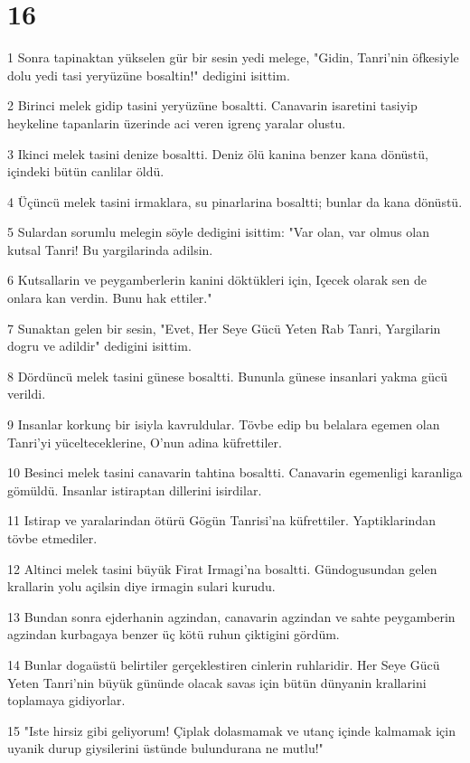 \chapter{16}

\par 1 Sonra tapinaktan yükselen gür bir sesin yedi melege, "Gidin, Tanri'nin öfkesiyle dolu yedi tasi yeryüzüne bosaltin!" dedigini isittim.
\par 2 Birinci melek gidip tasini yeryüzüne bosaltti. Canavarin isaretini tasiyip heykeline tapanlarin üzerinde aci veren igrenç yaralar olustu.
\par 3 Ikinci melek tasini denize bosaltti. Deniz ölü kanina benzer kana dönüstü, içindeki bütün canlilar öldü.
\par 4 Üçüncü melek tasini irmaklara, su pinarlarina bosaltti; bunlar da kana dönüstü.
\par 5 Sulardan sorumlu melegin söyle dedigini isittim: "Var olan, var olmus olan kutsal Tanri! Bu yargilarinda adilsin.
\par 6 Kutsallarin ve peygamberlerin kanini döktükleri için, Içecek olarak sen de onlara kan verdin. Bunu hak ettiler."
\par 7 Sunaktan gelen bir sesin, "Evet, Her Seye Gücü Yeten Rab Tanri, Yargilarin dogru ve adildir" dedigini isittim.
\par 8 Dördüncü melek tasini günese bosaltti. Bununla günese insanlari yakma gücü verildi.
\par 9 Insanlar korkunç bir isiyla kavruldular. Tövbe edip bu belalara egemen olan Tanri'yi yücelteceklerine, O'nun adina küfrettiler.
\par 10 Besinci melek tasini canavarin tahtina bosaltti. Canavarin egemenligi karanliga gömüldü. Insanlar istiraptan dillerini isirdilar.
\par 11 Istirap ve yaralarindan ötürü Gögün Tanrisi'na küfrettiler. Yaptiklarindan tövbe etmediler.
\par 12 Altinci melek tasini büyük Firat Irmagi'na bosaltti. Gündogusundan gelen krallarin yolu açilsin diye irmagin sulari kurudu.
\par 13 Bundan sonra ejderhanin agzindan, canavarin agzindan ve sahte peygamberin agzindan kurbagaya benzer üç kötü ruhun çiktigini gördüm.
\par 14 Bunlar dogaüstü belirtiler gerçeklestiren cinlerin ruhlaridir. Her Seye Gücü Yeten Tanri'nin büyük gününde olacak savas için bütün dünyanin krallarini toplamaya gidiyorlar.
\par 15 "Iste hirsiz gibi geliyorum! Çiplak dolasmamak ve utanç içinde kalmamak için uyanik durup giysilerini üstünde bulundurana ne mutlu!"
